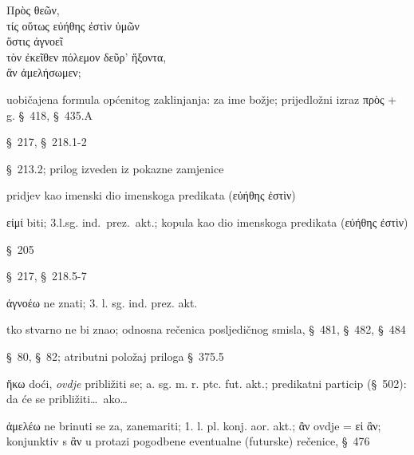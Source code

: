 
{\large
\begin{greek}
\noindent Πρὸς θεῶν,\\
τίς οὕτως εὐήθης ἐστὶν ὑμῶν \\
\tabto{2em} ὅστις ἀγνοεῖ \\
\tabto{3em} τὸν ἐκεῖθεν πόλεμον δεῦρ' ἥξοντα,\\
\tabto{3em} ἂν ἀμελήσωμεν;\\

\end{greek}
}

\begin{description}[noitemsep]
\item[Πρὸς θεῶν] uobičajena formula općenitog zaklinjanja: za ime božje; prijedložni izraz πρὸς + g. §~418, §~435.A
\item[τίς ] §~217, §~218.1-2
\item[οὕτως ] §~213.2; prilog izveden iz pokazne zamjenice
\item[εὐήθης ] pridjev kao imenski dio imenskoga predikata (εὐήθης ἐστὶν)
\item[ἐστὶν ] εἰμί biti; 3.l.sg. ind.\ prez.\ akt.; kopula kao dio imenskoga predikata (εὐήθης ἐστὶν)
\item[ὑμῶν ] §~205
\item[ὅστις ] §~217, §~218.5-7
\item[ἀγνοεῖ ] ἀγνοέω ne znati; 3. l. sg. ind. prez. akt. 
\item[ὅστις ἀγνοεῖ] tko stvarno ne bi znao; odnosna rečenica posljedičnog smisla, §~481, §~482, §~484
\item[τὸν ἐκεῖθεν πόλεμον] §~80, §~82; atributni položaj priloga §~375.5
\item[ἥξοντα] ἥκω doći, \textit{ovdje} približiti se; a. sg. m. r. ptc. fut. akt.; predikatni particip (§~502): da će se približiti\dots\ ako\dots
\item[ἂν ἀμελήσωμεν] ἀμελέω ne brinuti se za, zanemariti; 1. l. pl. konj. aor. akt.; ἂν ovdje = εἰ ἂν; konjunktiv s ἂν u protazi pogodbene eventualne (futurske) rečenice, §~476

\end{description}

